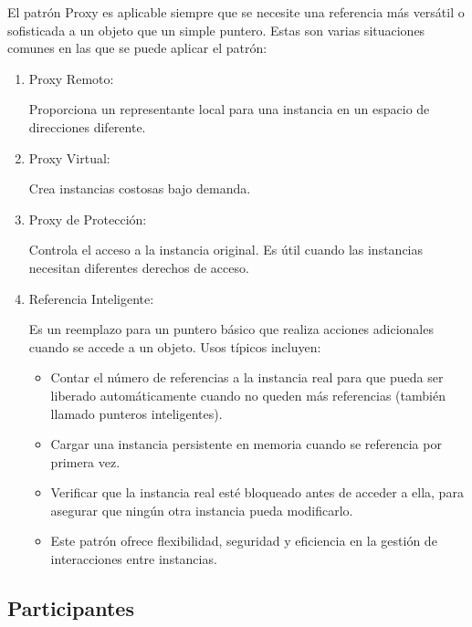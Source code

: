 El patrón Proxy es aplicable siempre que se necesite una referencia más versátil o sofisticada a un objeto que un simple puntero. Estas son varias situaciones comunes en las que se puede aplicar el patrón:

\begin{enumerate}
\item Proxy Remoto:

Proporciona un representante local para una instancia en un espacio de direcciones diferente.

\item Proxy Virtual:

Crea instancias costosas bajo demanda.

\item Proxy de Protección:

Controla el acceso a la instancia original.
Es útil cuando las instancias necesitan diferentes derechos de acceso.

\item Referencia Inteligente:

Es un reemplazo para un puntero básico que realiza acciones adicionales cuando se accede a un objeto.
Usos típicos incluyen:
\begin{itemize}
\item Contar el número de referencias a la instancia real para que pueda ser liberado automáticamente cuando no queden más referencias (también llamado punteros inteligentes).
\item Cargar una instancia persistente en memoria cuando se referencia por primera vez.
\item Verificar que la instancia real esté bloqueado antes de acceder a ella, para asegurar que ningún otra instancia pueda modificarlo.
\item 
Este patrón ofrece flexibilidad, seguridad y eficiencia en la gestión de interacciones entre instancias.
\end{itemize}

\end{enumerate}


\subsection*{Participantes}

